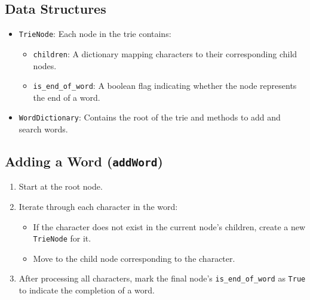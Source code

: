 \subsection*{Data Structures}
\begin{itemize}
    \item \texttt{TrieNode}:  
    Each node in the trie contains:
    \begin{itemize}
        \item \texttt{children}: A dictionary mapping characters to their corresponding child nodes.
        \item \texttt{is\_end\_of\_word}: A boolean flag indicating whether the node represents the end of a word.
    \end{itemize}
    
    \item \texttt{WordDictionary}:  
    Contains the root of the trie and methods to add and search words.
\end{itemize}

\subsection*{Adding a Word (\texttt{addWord})}
\begin{enumerate}
    \item Start at the root node.
    \item Iterate through each character in the word:
    \begin{itemize}
        \item If the character does not exist in the current node's children, create a new \texttt{TrieNode} for it.
        \item Move to the child node corresponding to the character.
    \end{itemize}
    \item After processing all characters, mark the final node's \texttt{is\_end\_of\_word} as \texttt{True} to indicate the completion of a word.
\end{enumerate}

